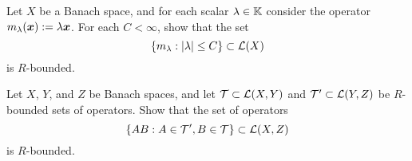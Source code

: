 \begin{exercise}
  Let $X$ be a Banach space, and for each scalar $\lambda \in \mathbb{K}$ consider the operator $m_{\lambda}(\bm{x}) := \lambda \bm{x}$.
  For each $C < \infty$, show that the set
  \begin{equation*}
    \{m_{\lambda} : |\lambda| \leq C\} \subset \mathcal{L}(X)
  \end{equation*}
  is $R$-bounded.
\end{exercise}

\begin{exercise}
  Let $X$, $Y$, and $Z$ be Banach spaces, and let $\mathcal{T} \subset \mathcal{L}(X,Y)$ and $\mathcal{T}' \subset \mathcal{L}(Y,Z)$ be $R$-bounded sets of operators.
  Show that the set of operators
  \begin{equation*}
    \{AB : A \in \mathcal{T}', B \in \mathcal{T}\} \subset \mathcal{L}(X,Z)
  \end{equation*}
  is $R$-bounded.
\end{exercise}


